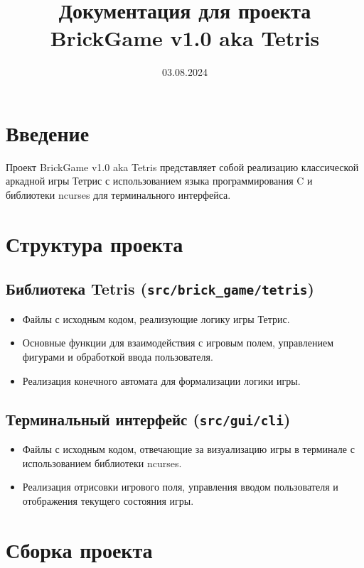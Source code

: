 \documentclass[11pt,a4paper]{article}
\begin{document}
\title{Документация для проекта BrickGame v1.0 aka Tetris}
\date{03.08.2024}
\maketitle

\section{Введение}

Проект BrickGame v1.0 aka Tetris представляет собой реализацию классической аркадной игры Тетрис с использованием языка программирования C и библиотеки ncurses для терминального интерфейса.

\section{Структура проекта}

\subsection{Библиотека Tetris (\texttt{src/brick\_game/tetris})}

\begin{itemize}[label=--]
    \item Файлы с исходным кодом, реализующие логику игры Тетрис.
    \item Основные функции для взаимодействия с игровым полем, управлением фигурами и обработкой ввода пользователя.
    \item Реализация конечного автомата для формализации логики игры.
\end{itemize}

\subsection{Терминальный интерфейс (\texttt{src/gui/cli})}

\begin{itemize}[label=--]
    \item Файлы с исходным кодом, отвечающие за визуализацию игры в терминале с использованием библиотеки ncurses.
    \item Реализация отрисовки игрового поля, управления вводом пользователя и отображения текущего состояния игры.
\end{itemize}

\section{Сборка проекта}
\end{document}
